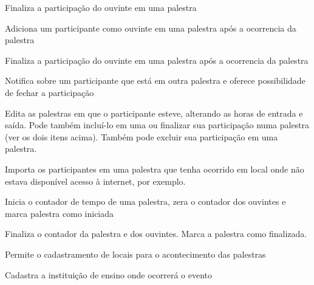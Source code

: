 \documentclass[12pt,a4paper]{article}
\begin{document}
				{Finaliza a participação do ouvinte em uma palestra}
				{%
				
				}
				
				{Adiciona um participante como ouvinte em uma palestra após a ocorrencia da palestra}
				{%
				
				}
				
				{Finaliza a participação do ouvinte em uma palestra após a ocorrencia da palestra}
				{%
				
				}
				
				{Notifica sobre um participante que está em outra palestra e oferece possibilidade de fechar a participação}
				{%
				
				}
				
				{Edita as palestras em que o participante esteve, alterando as horas de entrada e saída. Pode também incluí-lo em uma ou finalizar sua participação numa palestra (ver os dois itens acima). Também pode excluir sua participação em uma palestra.}
				{%
				
				}
							
				
				{Importa os participantes em uma palestra que tenha ocorrido em local onde não estava disponível acesso à internet, por exemplo.}
				{%
				
				}
				
				{Inicia o contador de tempo de uma palestra, zera o contador dos ouvintes e marca palestra como iniciada}
				{%
				
				}
				
				{Finaliza o contador da palestra e dos ouvintes. Marca a palestra como finalizada.}
				{%
				
				}
				
				
				
				{Permite o cadastramento de locais para o acontecimento das palestras}
				{%
				
				}
				
				{Cadastra a instituição de ensino onde ocorrerá o evento}
				{%
				
				}
						
\end{document}
